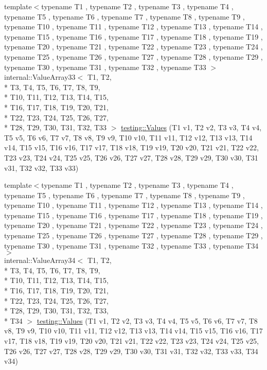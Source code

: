 \begin{DoxyCompactItemize}
\item 
{\footnotesize template$<$typename T1 , typename T2 , typename T3 , typename T4 , typename T5 , typename T6 , typename T7 , typename T8 , typename T9 , typename T10 , typename T11 , typename T12 , typename T13 , typename T14 , typename T15 , typename T16 , typename T17 , typename T18 , typename T19 , typename T20 , typename T21 , typename T22 , typename T23 , typename T24 , typename T25 , typename T26 , typename T27 , typename T28 , typename T29 , typename T30 , typename T31 , typename T32 , typename T33 $>$ }\\internal\-::\-Value\-Array33$<$ T1, T2, \\*
T3, T4, T5, T6, T7, T8, T9, \\*
T10, T11, T12, T13, T14, T15, \\*
T16, T17, T18, T19, T20, T21, \\*
T22, T23, T24, T25, T26, T27, \\*
T28, T29, T30, T31, T32, T33 $>$ \hyperlink{namespacetesting_ac972228f2ff86974ab6591a10512326a}{testing\-::\-Values} (T1 v1, T2 v2, T3 v3, T4 v4, T5 v5, T6 v6, T7 v7, T8 v8, T9 v9, T10 v10, T11 v11, T12 v12, T13 v13, T14 v14, T15 v15, T16 v16, T17 v17, T18 v18, T19 v19, T20 v20, T21 v21, T22 v22, T23 v23, T24 v24, T25 v25, T26 v26, T27 v27, T28 v28, T29 v29, T30 v30, T31 v31, T32 v32, T33 v33)
\item 
{\footnotesize template$<$typename T1 , typename T2 , typename T3 , typename T4 , typename T5 , typename T6 , typename T7 , typename T8 , typename T9 , typename T10 , typename T11 , typename T12 , typename T13 , typename T14 , typename T15 , typename T16 , typename T17 , typename T18 , typename T19 , typename T20 , typename T21 , typename T22 , typename T23 , typename T24 , typename T25 , typename T26 , typename T27 , typename T28 , typename T29 , typename T30 , typename T31 , typename T32 , typename T33 , typename T34 $>$ }\\internal\-::\-Value\-Array34$<$ T1, T2, \\*
T3, T4, T5, T6, T7, T8, T9, \\*
T10, T11, T12, T13, T14, T15, \\*
T16, T17, T18, T19, T20, T21, \\*
T22, T23, T24, T25, T26, T27, \\*
T28, T29, T30, T31, T32, T33, \\*
T34 $>$ \hyperlink{namespacetesting_a37ae9a0b15ed1e02fda22769ef76c97e}{testing\-::\-Values} (T1 v1, T2 v2, T3 v3, T4 v4, T5 v5, T6 v6, T7 v7, T8 v8, T9 v9, T10 v10, T11 v11, T12 v12, T13 v13, T14 v14, T15 v15, T16 v16, T17 v17, T18 v18, T19 v19, T20 v20, T21 v21, T22 v22, T23 v23, T24 v24, T25 v25, T26 v26, T27 v27, T28 v28, T29 v29, T30 v30, T31 v31, T32 v32, T33 v33, T34 v34)

\end{DoxyCompactItemize}
